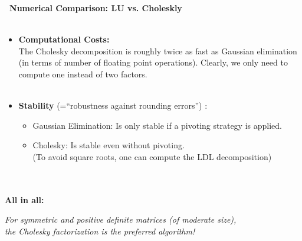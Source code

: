 
\begin{frame}
	\textbf{~Numerical Comparison: LU vs. Choleskly}\\~\\
	\begin{itemize}
		\item \textbf{Computational Costs:} ~\\The Cholesky decomposition is roughly twice as fast as Gaussian elimination (in terms of number of floating point operations). Clearly, we only need to compute one instead of two factors.\\~\\
		\item \textbf{Stability} (=``robustness against rounding errors'') :
		\begin{itemize}\normalsize
			\item Gaussian Elimination: Is only stable if a pivoting strategy is applied.
			\item Cholesky: Is stable even without pivoting.\\ (To avoid square roots, one can compute the LDL decomposition)
		\end{itemize}
	\end{itemize}
~\\~\\
\textbf{All in all:} \begin{center}
	\textit{For symmetric and positive definite matrices (of moderate size),\\ the Cholesky factorization is the preferred algorithm!}
\end{center}
\end{frame}


